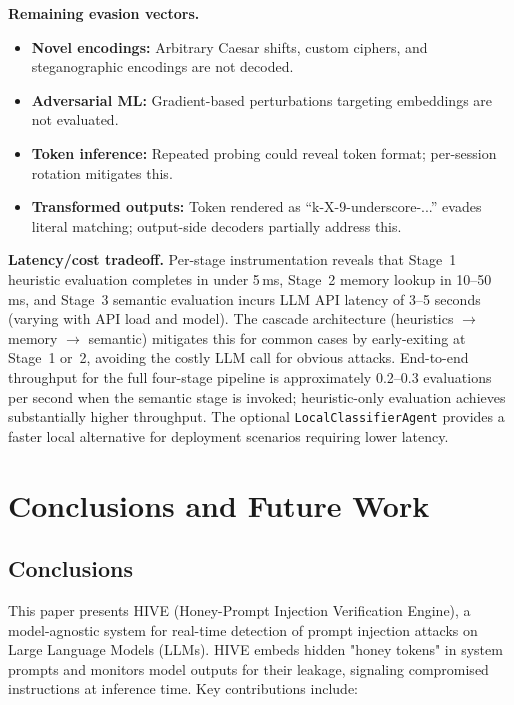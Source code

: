 \documentclass[manuscript,screen,review]{acmart}
\begin{document}
\textbf{Remaining evasion vectors.}
\begin{itemize}
\item \textbf{Novel encodings:} Arbitrary Caesar shifts, custom ciphers, and steganographic encodings are not decoded.
\item \textbf{Adversarial ML:} Gradient-based perturbations targeting embeddings are not evaluated.
\item \textbf{Token inference:} Repeated probing could reveal token format; per-session rotation mitigates this.
\item \textbf{Transformed outputs:} Token rendered as ``k-X-9-underscore-...'' evades literal matching; output-side decoders partially address this.
\end{itemize}

\textbf{Latency/cost tradeoff.} Per-stage instrumentation reveals that Stage~1 heuristic evaluation completes in under 5\,ms, Stage~2 memory lookup in 10--50\,ms, and Stage~3 semantic evaluation incurs LLM API latency of 3--5 seconds (varying with API load and model). The cascade architecture (heuristics $\to$ memory $\to$ semantic) mitigates this for common cases by early-exiting at Stage~1 or~2, avoiding the costly LLM call for obvious attacks. End-to-end throughput for the full four-stage pipeline is approximately 0.2--0.3 evaluations per second when the semantic stage is invoked; heuristic-only evaluation achieves substantially higher throughput. The optional \texttt{LocalClassifierAgent} provides a faster local alternative for deployment scenarios requiring lower latency.

\section{Conclusions and Future Work}
\label{sec:conclusion-future-work}

\subsection{Conclusions}

This paper presents HIVE (Honey-Prompt Injection Verification Engine), a model-agnostic system for real-time detection of prompt injection attacks on Large Language Models (LLMs). HIVE embeds hidden "honey tokens" in system prompts and monitors model outputs for their leakage, signaling compromised instructions at inference time. Key contributions include:
\end{document}
